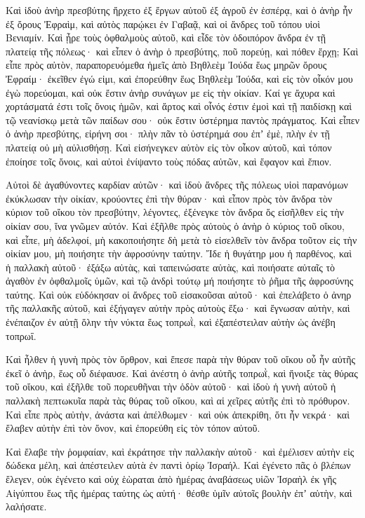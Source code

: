 {\par }{\PP {}Καὶ ἰδοὺ ἀνὴρ πρεσβύτης ἤρχετο ἐξ ἔργων αὐτοῦ ἐξ ἀγροῦ ἐν ἑσπέρᾳ, καὶ ὁ ἀνὴρ ἦν ἐξ ὄρους Ἐφραὶμ, καὶ αὐτὸς παρῴκει ἐν Γαβαᾷ, καὶ οἱ ἄνδρες τοῦ τόπου υἱοὶ Βενιαμίν.
Καὶ ᾖρε τοὺς ὀφθαλμοὺς αὐτοῦ, καὶ εἶδε τὸν ὁδοιπόρον ἄνδρα ἐν τῇ πλατείᾳ τῆς πόλεως· καὶ εἶπεν ὁ ἀνὴρ ὁ πρεσβύτης, ποῦ πορεύῃ, καὶ πόθεν ἔρχῃ;
Καὶ εἶπε πρὸς αὐτὸν, παραπορευόμεθα ἡμεῖς ἀπὸ Βηθλεὲμ Ἰούδα ἕως μηρῶν ὄρους Ἐφραίμ· ἐκεῖθεν ἐγώ εἰμι, καὶ ἐπορεύθην ἕως Βηθλεὲμ Ἰούδα, καὶ εἰς τὸν οἶκόν μου ἐγὼ πορεύομαι, καὶ οὐκ ἔστιν ἀνὴρ συνάγων με εἰς τὴν οἰκίαν.
Καί γε ἄχυρα καὶ χορτάσματά ἐστι τοῖς ὄνοις ἡμῶν, καὶ ἄρτος καὶ οἶνός ἐστιν ἐμοὶ καὶ τῇ παιδίσκῃ καὶ τῷ νεανίσκῳ μετὰ τῶν παίδων σου· οὐκ ἔστιν ὑστέρημα παντὸς πράγματος.
Καὶ εἶπεν ὁ ἀνὴρ πρεσβύτης, εἰρήνη σοι· πλὴν πᾶν τὸ ὑστέρημά σου ἐπʼ ἐμὲ, πλὴν ἐν τῇ πλατείᾳ οὐ μὴ αὐλισθήσῃ.
Καὶ εἰσήνεγκεν αὐτὸν εἰς τὸν οἶκον αὐτοῦ, καὶ τόπον ἐποίησε τοῖς ὄνοις, καὶ αὐτοὶ ἐνίψαντο τοὺς πόδας αὐτῶν, καὶ ἔφαγον καὶ ἔπιον.
\par }{\PP {}Αὐτοὶ δὲ ἀγαθύνοντες καρδίαν αὐτῶν· καὶ ἰδοὺ ἄνδρες τῆς πόλεως υἱοὶ παρανόμων ἐκύκλωσαν τὴν οἰκίαν, κρούοντες ἐπὶ τὴν θύραν· καὶ εἶπον πρὸς τὸν ἄνδρα τὸν κύριον τοῦ οἴκου τὸν πρεσβύτην, λέγοντες, ἐξένεγκε τὸν ἄνδρα ὅς εἰσῆλθεν εἰς τὴν οἰκίαν σου, ἵνα γνῶμεν αὐτόν.
Καὶ ἐξῆλθε πρὸς αὐτοὺς ὁ ἀνὴρ ὁ κύριος τοῦ οἴκου, καὶ εἶπε, μὴ ἀδελφοί, μὴ κακοποιήσητε δὴ μετὰ τὸ εἰσελθεῖν τὸν ἄνδρα τοῦτον εἰς τὴν οἰκίαν μου, μὴ ποιήσητε τὴν ἀφροσύνην ταύτην.
Ἴδε ἡ θυγάτηρ μου ἡ παρθένος, καὶ ἡ παλλακὴ αὐτοῦ· ἐξάξω αὐτὰς, καὶ ταπεινώσατε αὐτὰς, καὶ ποιήσατε αὐταῖς τὸ ἀγαθὸν ἐν ὀφθαλμοῖς ὑμῶν, καὶ τῷ ἀνδρὶ τούτῳ μή ποιήσητε τὸ ῥῆμα τῆς ἀφροσύνης ταύτης.
Καὶ οὐκ εὐδόκησαν οἱ ἄνδρες τοῦ εἰσακοῦσαι αὐτοῦ· καὶ ἐπελάβετο ὁ ἀνηρ τῆς παλλακῆς αὐτοῦ, καὶ ἐξήγαγεν αὐτὴν πρὸς αὐτοὺς ἔξω· καὶ ἔγνωσαν αὐτὴν, καὶ ἐνέπαιζον ἐν αὐτῇ ὅλην τὴν νύκτα ἕως τοπρωῒ, καὶ ἐξαπέστειλαν αὐτὴν ὡς ἀνέβη τοπρωΐ.
\par }{\PP {}Καὶ ἦλθεν ἡ γυνὴ πρὸς τὸν ὄρθρον, καὶ ἔπεσε παρὰ τὴν θύραν τοῦ οἴκου οὗ ἦν αὐτῆς ἐκεῖ ὁ ἀνὴρ, ἕως οὗ διέφαυσε.
Καὶ ἀνέστη ὁ ἀνὴρ αὐτῆς τοπρωῒ, καὶ ἤνοιξε τὰς θύρας τοῦ οἴκου, καὶ ἐξῆλθε τοῦ πορευθῆναι τὴν ὁδὸν αὐτοῦ· καὶ ἰδοὺ ἡ γυνὴ αὐτοῦ ἡ παλλακὴ πεπτωκυῖα παρὰ τὰς θύρας τοῦ οἴκου, καὶ αἱ χεῖρες αὐτῆς ἐπὶ τὸ πρόθυρον.
Καὶ εἶπε πρὸς αὐτὴν, ἀνάστα καὶ ἀπέλθωμεν· καὶ οὐκ ἀπεκρίθη, ὅτι ἦν νεκρά· καὶ ἔλαβεν αὐτὴν ἐπὶ τὸν ὄνον, καὶ ἐπορεύθη εἰς τὸν τόπον αὐτοῦ.
\par }{\PP {}Καὶ ἔλαβε τὴν ῥομφαίαν, καὶ ἐκράτησε τὴν παλλακὴν αὐτοῦ· καὶ ἐμέλισεν αὐτὴν εἰς δώδεκα μέλη, καὶ ἀπέστειλεν αὐτὰ ἐν παντὶ ὁρίῳ Ἰσραήλ.
Καὶ ἐγένετο πᾶς ὁ βλέπων ἔλεγεν, οὐκ ἐγένετο καὶ οὐχ ἑὼραται ἀπὸ ἡμέρας ἀναβάσεως υἱῶν Ἰσραὴλ ἐκ γῆς Αἰγύπτου ἕως τῆς ἡμέρας ταύτης ὠς αὐτή· θέσθε ὑμῖν αὐτοῖς βουλὴν ἐπʼ αὐτὴν, καὶ λαλήσατε.

}
